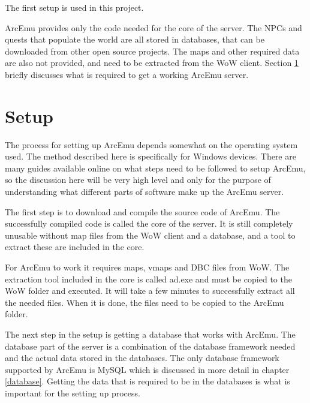 The first setup is used in this project. 

ArcEmu provides only the code needed for the core of the server. The NPCs and quests that populate the world are all stored in databases, that can be downloaded from other open source projects. The maps and other required data are also not provided, and need to be extracted from the WoW client.  Section \ref{setup} briefly discusses what is required to get a working ArcEmu server.



\section{Setup} %
\label{setup}
The process for setting up ArcEmu depends somewhat on the operating system used. The method described here is specifically for Windows devices.
There are many guides available online on what steps need to be followed to setup ArcEmu, so the discussion here will be very high level and only for the purpose of understanding what different parts of software make up the ArcEmu server.

The first step is to download and compile the source code of ArcEmu. %
The successfully compiled code is called the core of the server. It is still completely unusable without map files from the WoW client and a database, and a tool to extract these are included in the core.

For ArcEmu to work it requires maps, vmaps and DBC files from WoW. The extraction tool included in the core is called ad.exe and must be copied to the WoW folder and executed. It will take a few minutes to successfully extract all the needed files. When it is done, the files need to be copied to the ArcEmu folder.

The next step in the setup is getting a database that works with ArcEmu. The database part of the server is a combination of the database framework needed and the actual data stored in the databases.
The only database framework supported by ArcEmu is MySQL which is discussed in more detail in chapter \ref{database}. Getting the data that is required to be in the databases is what is important for the setting up process.

